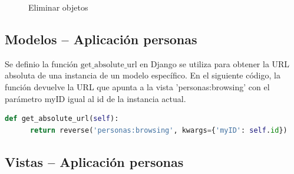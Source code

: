 \documentclass{article}
\begin{document}
  \begin{figure}[H]
    \centering
    \caption{Eliminar objetos}
  \end{figure}
  

  \subsection{Modelos -- Aplicación personas}
  Se definio la función $\text{get\_absolute\_url}$ en Django se utiliza para obtener la URL absoluta de una instancia de un modelo específico. 
  En el siguiente código, la función devuelve la URL que apunta a la vista 'personas:browsing' con el parámetro myID igual al id de la 
  instancia actual.
  \begin{lstlisting}[language=Python, caption={Modelo Persona}]
    def get_absolute_url(self):
      return reverse('personas:browsing', kwargs={'myID': self.id})
  \end{lstlisting}
    

  \subsection{Vistas -- Aplicación personas}
  
  
\end{document}
